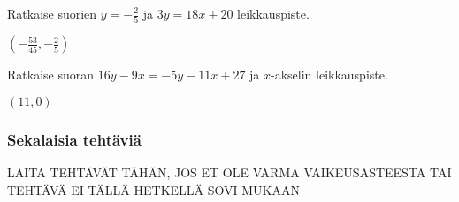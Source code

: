 \begin{tehtavasivu}
\begin{tehtava}
Ratkaise suorien $y=-\frac{2}{5}$ ja $3y=18x+20$ leikkauspiste.
\begin{vastaus}
$(-\frac{53}{45}, -\frac{2}{5})$
\end{vastaus}
\end{tehtava}

\begin{tehtava}
Ratkaise suoran $16y-9x=-5y-11x+27$ ja $x$-akselin leikkauspiste.
\begin{vastaus}
$(11, 0)$
\end{vastaus}
\end{tehtava}

\subsubsection*{Sekalaisia tehtäviä}

LAITA TEHTÄVÄT TÄHÄN, JOS ET OLE VARMA VAIKEUSASTEESTA TAI TEHTÄVÄ
EI TÄLLÄ HETKELLÄ SOVI MUKAAN

\end{tehtavasivu}
